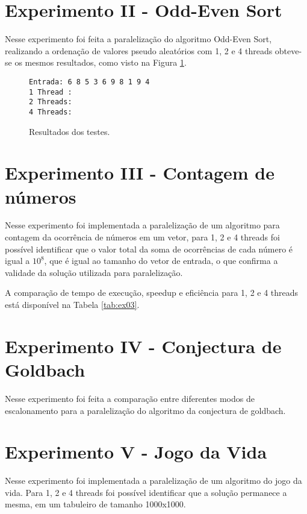 \documentclass[conference]{IEEEtran}
\begin{document}
\section{Experimento II - Odd-Even Sort}
Nesse experimento foi feita a paralelização do algoritmo Odd-Even Sort, realizando a ordenação de valores pseudo aleatórios com 1, 2 e 4 threads obteve-se os mesmos resultados, como visto na Figura \ref{fig:ex02}.
\begin{figure}[htb!]
	\begin{adjustbox}{max width=\linewidth}
		\begin{BVerbatim}
Entrada: 6 8 5 3 6 9 8 1 9 4 
1 Thread : 
2 Threads: 
4 Threads: 
		\end{BVerbatim}
	\end{adjustbox}
	\caption{Resultados dos testes.\label{fig:ex02}}
\end{figure}


\section{Experimento III - Contagem de números}
Nesse experimento foi implementada a paralelização de um algoritmo para contagem da ocorrência de números em um vetor, para 1, 2 e 4 threads foi possível identificar que o valor total da soma de ocorrências de cada número é igual a $10^8$, que é igual ao tamanho do vetor de entrada, o que confirma a validade da solução utilizada para paralelização.

A comparação de tempo de execução, speedup e eficiência para 1, 2 e 4 threads está disponível na Tabela \ref{tab:ex03}.

\section{Experimento IV - Conjectura de Goldbach}
Nesse experimento foi feita a comparação entre diferentes modos de escalonamento para a paralelização do algoritmo da conjectura de goldbach.

\section{Experimento V - Jogo da Vida}
Nesse experimento foi implementada a paralelização de um algoritmo do jogo da vida.
Para 1, 2 e 4 threads foi possível identificar que a solução permanece a mesma, em um tabuleiro de tamanho 1000x1000.




%
\end{document}
